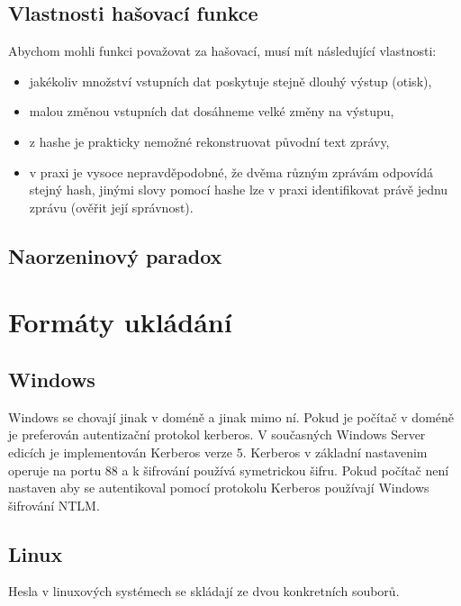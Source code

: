 \documentclass[thesis=B,czech]{FITthesis}[2019/12/23]
\begin{document}
\subsection{Vlastnosti hašovací funkce}

Abychom mohli funkci považovat za hašovací, musí mít následující vlastnosti:

\begin{itemize}
    \item jakékoliv množství vstupních dat poskytuje stejně dlouhý výstup (otisk),
    \item malou změnou vstupních dat dosáhneme velké změny na výstupu,
    \item z hashe je prakticky nemožné rekonstruovat původní text zprávy,
    \item v praxi je vysoce nepravděpodobné, že dvěma různým zprávám odpovídá stejný hash, jinými slovy pomocí hashe lze v praxi identifikovat právě jednu zprávu (ověřit její správnost).
\end{itemize}


\subsection{Naorzeninový paradox}

\section{Formáty ukládání}

\subsection{Windows}

Windows se chovají jinak v doméně a jinak mimo ní. Pokud je počítač v doméně je preferován autentizační protokol kerberos. V současných Windows Server edicích je implementován Kerberos verze 5. Kerberos v základní nastavenim operuje na portu 88 a k šifrování používá symetrickou šifru. 
Pokud počítač není nastaven aby se autentikoval pomocí protokolu Kerberos používají Windows šifrování NTLM.

\subsection{Linux}

Hesla v linuxových systémech se skládají ze dvou konkretních souborů. 
\end{document}
